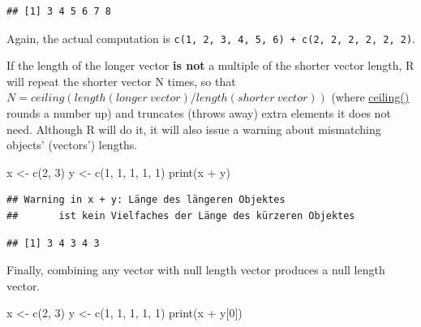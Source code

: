 \documentclass[
]{book}
\newenvironment{Shaded}{\begin{snugshade}}{\end{snugshade}}
\newcommand{\DecValTok}[1]{\textcolor[rgb]{0.00,0.00,0.81}{#1}}
\newcommand{\FunctionTok}[1]{\textcolor[rgb]{0.00,0.00,0.00}{#1}}
\newcommand{\NormalTok}[1]{#1}
\newcommand{\OtherTok}[1]{\textcolor[rgb]{0.56,0.35,0.01}{#1}}
\newcommand{\SpecialCharTok}[1]{\textcolor[rgb]{0.00,0.00,0.00}{#1}}
\begin{document}
\begin{verbatim}
## [1] 3 4 5 6 7 8
\end{verbatim}

Again, the actual computation is \texttt{c(1,\ 2,\ 3,\ 4,\ 5,\ 6)\ +\ c(2,\ 2,\ 2,\ 2,\ 2,\ 2)}.

If the length of the longer vector \textbf{is not} a multiple of the shorter vector length, R will repeat the shorter vector N times, so that \(N = ceiling(length(longer~vector) / length(shorter~vector))\) (where \href{https://www.rdocumentation.org/packages/base/versions/3.6.2/topics/Round}{ceiling()} rounds a number up) and truncates (throws away) extra elements it does not need. Although R will do it, it will also issue a warning about mismatching objects' (vectors') lengths.

\begin{Shaded}
\begin{Highlighting}[]
\NormalTok{x }\OtherTok{\textless{}{-}} \FunctionTok{c}\NormalTok{(}\DecValTok{2}\NormalTok{, }\DecValTok{3}\NormalTok{)}
\NormalTok{y }\OtherTok{\textless{}{-}} \FunctionTok{c}\NormalTok{(}\DecValTok{1}\NormalTok{, }\DecValTok{1}\NormalTok{, }\DecValTok{1}\NormalTok{, }\DecValTok{1}\NormalTok{, }\DecValTok{1}\NormalTok{)}
\FunctionTok{print}\NormalTok{(x }\SpecialCharTok{+}\NormalTok{ y)}
\end{Highlighting}
\end{Shaded}

\begin{verbatim}
## Warning in x + y: Länge des längeren Objektes
##       ist kein Vielfaches der Länge des kürzeren Objektes
\end{verbatim}

\begin{verbatim}
## [1] 3 4 3 4 3
\end{verbatim}

Finally, combining any vector with null length vector produces a null length vector.

\begin{Shaded}
\begin{Highlighting}[]
\NormalTok{x }\OtherTok{\textless{}{-}} \FunctionTok{c}\NormalTok{(}\DecValTok{2}\NormalTok{, }\DecValTok{3}\NormalTok{)}
\NormalTok{y }\OtherTok{\textless{}{-}} \FunctionTok{c}\NormalTok{(}\DecValTok{1}\NormalTok{, }\DecValTok{1}\NormalTok{, }\DecValTok{1}\NormalTok{, }\DecValTok{1}\NormalTok{, }\DecValTok{1}\NormalTok{)}
\FunctionTok{print}\NormalTok{(x }\SpecialCharTok{+}\NormalTok{ y[}\DecValTok{0}\NormalTok{])}
\end{Highlighting}
\end{Shaded}
\end{document}
